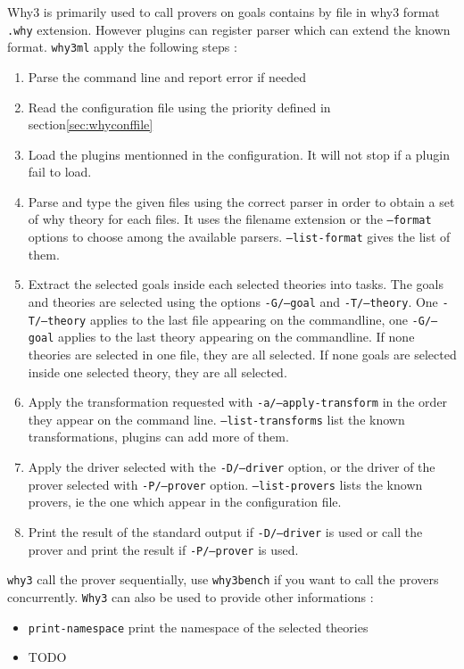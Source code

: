 Why3 is primarily used to call provers on goals contains by file in
why3 format \texttt{.why} extension. However plugins can register
parser which can extend the known format. \texttt{why3ml} apply the
following steps :
\begin{enumerate}
\item Parse the command line and report error if needed
\item Read the configuration file using the priority defined in
  section\ref{sec:whyconffile}
\item Load the plugins mentionned in the configuration. It will not
  stop if a plugin fail to load.
\item Parse and type the given files using the correct parser in order
  to obtain a set of why theory for each files. It uses
  the filename extension or the \texttt{--format} options to choose
  among the available parsers. \texttt{--list-format} gives the list
  of them.
\item Extract the selected goals inside each selected theories into
  tasks. The goals and theories are selected using the options
  \texttt{-G/--goal} and \texttt{-T/--theory}. One
  \texttt{-T/--theory} applies to the last file appearing on the
  commandline, one \texttt{-G/--goal} applies to the last theory
  appearing on the commandline. If none theories are selected in one
  file, they are all selected. If none goals are selected inside one
  selected theory, they are all selected.
\item Apply the transformation requested
  with \texttt{-a/--apply-transform} in the order they appear on the
  command line. \texttt{--list-transforms} list the known
  transformations, plugins can add more of them.
\item Apply the driver selected with the \texttt{-D/--driver} option,
  or the driver of the prover selected with \texttt{-P/--prover}
  option. \texttt{--list-provers} lists the known provers, ie the one
  which appear in the configuration file.
\item Print the result of the standard output if \texttt{-D/--driver}
  is used or call the prover and print the result if
  \texttt{-P/--prover} is used.
\end{enumerate}

\texttt{why3} call the prover sequentially, use \texttt{why3bench} if
you want to call the provers concurrently. \texttt{Why3} can also be
used to provide other informations :
\begin{itemize}
\item \texttt{print-namespace} print the namespace of the selected
  theories
\item TODO
\end{itemize}

